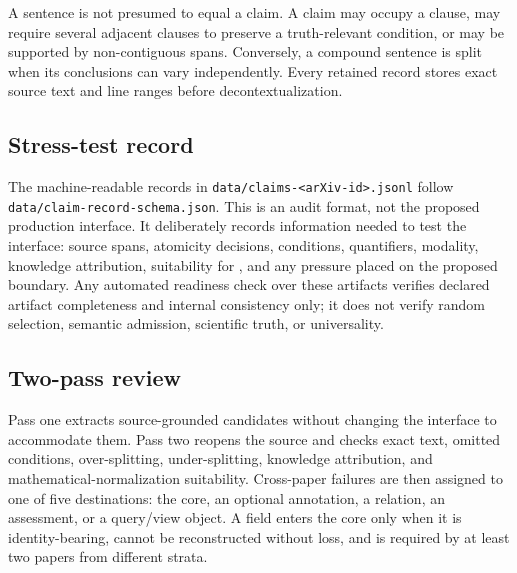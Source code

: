 A sentence is not presumed to equal a claim. A claim may occupy a clause, may require several adjacent clauses to preserve a truth-relevant condition, or may be supported by non-contiguous spans. Conversely, a compound sentence is split when its conclusions can vary independently. Every retained record stores exact source text and line ranges before decontextualization.

\subsection{Stress-test record}
The machine-readable records in \texttt{data/claims-<arXiv-id>.jsonl} follow \texttt{data/claim-record-schema.json}. This is an audit format, not the proposed production interface. It deliberately records information needed to test the interface: source spans, atomicity decisions, conditions, quantifiers, modality, knowledge attribution, suitability for \MathClaimIR{}, and any pressure placed on the proposed boundary. Any automated readiness check over these artifacts verifies declared artifact completeness and internal consistency only; it does not verify random selection, semantic admission, scientific truth, or universality.

\subsection{Two-pass review}
Pass one extracts source-grounded candidates without changing the interface to accommodate them. Pass two reopens the source and checks exact text, omitted conditions, over-splitting, under-splitting, knowledge attribution, and mathematical-normalization suitability. Cross-paper failures are then assigned to one of five destinations: the \ScientificClaim{} core, an optional annotation, a relation, an assessment, or a query/view object. A field enters the core only when it is identity-bearing, cannot be reconstructed without loss, and is required by at least two papers from different strata.
